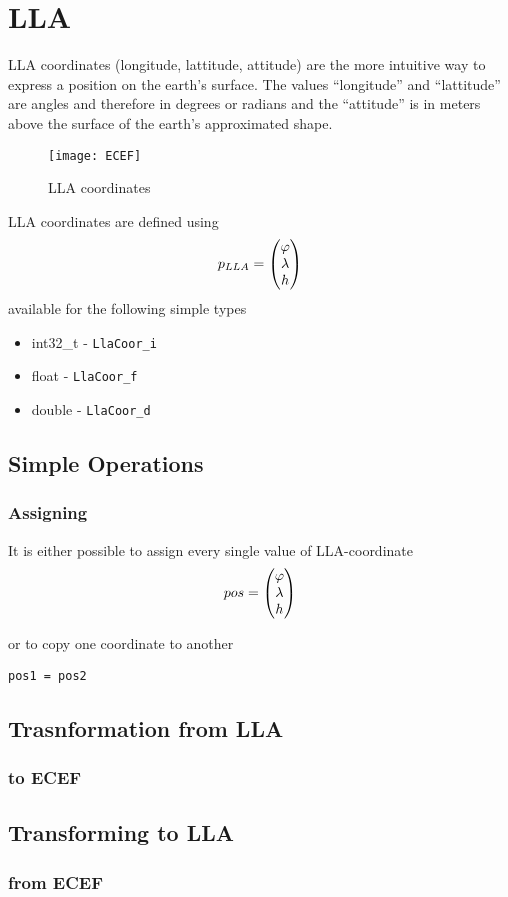 \section{LLA}
LLA coordinates (longitude, lattitude, attitude) are the more intuitive way to express a position on the earth's surface. The values ``longitude'' and ``lattitude'' are angles and therefore in degrees or radians and the ``attitude'' is in meters above the surface of the earth's approximated shape. 

\begin{figure}[h!]
	\centering
	\texttt{[image: ECEF]}
	\caption{LLA coordinates}
	\label{LLA coordinates1}
\end{figure}

LLA coordinates are defined using
\begin{equation}
p_{LLA} = \begin{pmatrix} \lat \\ \lon \\ h \end{pmatrix}
\end{equation}
available for the following simple types
\begin{itemize}
\item int32\_t - \texttt{LlaCoor\_i}
\item float - \texttt{LlaCoor\_f}
\item double - \texttt{LlaCoor\_d}
\end{itemize}

\subsection{Simple Operations}
\subsubsection*{Assigning}
It is either possible to assign every single value of LLA-coordinate
\begin{equation}
pos = \begin{pmatrix}	\lat	\\
						\lon	\\
						h		\end{pmatrix}
\end{equation}

\noindent
or to copy one coordinate to another

\texttt{pos1 = pos2}\\


\subsection{Trasnformation from LLA}
\subsubsection*{to ECEF}



\subsection{Transforming to LLA}
\subsubsection*{from ECEF}
